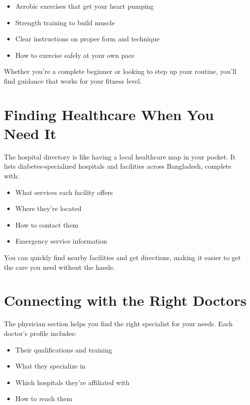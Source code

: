 \documentclass[12pt,a4paper]{article}
\begin{document}
\begin{itemize}
    \item Aerobic exercises that get your heart pumping
    \item Strength training to build muscle
    \item Clear instructions on proper form and technique
    \item How to exercise safely at your own pace
\end{itemize}

Whether you're a complete beginner or looking to step up your routine, you'll find guidance that works for your fitness level.

\section{Finding Healthcare When You Need It}

The hospital directory is like having a local healthcare map in your pocket. It lists diabetes-specialized hospitals and facilities across Bangladesh, complete with:

\begin{itemize}
    \item What services each facility offers
    \item Where they're located
    \item How to contact them
    \item Emergency service information
\end{itemize}

You can quickly find nearby facilities and get directions, making it easier to get the care you need without the hassle.

\section{Connecting with the Right Doctors}

The physician section helps you find the right specialist for your needs. Each doctor's profile includes:

\begin{itemize}
    \item Their qualifications and training
    \item What they specialize in
    \item Which hospitals they're affiliated with
    \item How to reach them
\end{itemize}
\end{document}
